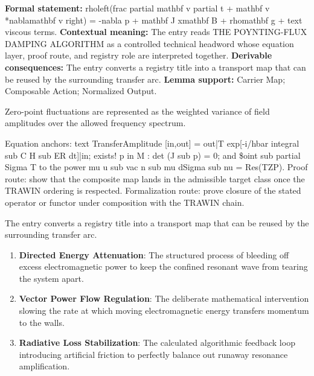\begingroup\footnotesize\setlength{\emergencystretch}{3em}\sloppy
\textbf{Formal statement:} rholeft(frac partial mathbf v partial t + mathbf v *nablamathbf v right) = -nabla p + mathbf J xmathbf B + rhomathbf g + text viscous terms. \textbf{Contextual meaning:} The entry reads THE POYNTING-FLUX DAMPING ALGORITHM as a controlled technical headword whose equation layer, proof route, and registry role are interpreted together. \textbf{Derivable consequences:} The entry converts a registry title into a transport map that can be reused by the surrounding transfer arc. \textbf{Lemma support:} Carrier Map; Composable Action; Normalized Output.\par
\endgroup

Zero-point fluctuations are represented as the weighted variance of field amplitudes over the allowed frequency spectrum.

Equation anchors: text TransferAmplitude [in,out] = out|T exp[-i/hbar integral sub C H sub ER dt]|in; exists! p in M : det (J sub p) = 0; and \$oint sub partial Sigma T to the power mu u sub vac n sub mu dSigma sub nu = Res(TZP). Proof route: show that the composite map lands in the admissible target class once the TRAWIN ordering is respected. Formalization route: prove closure of the stated operator or functor under composition with the TRAWIN chain.

The entry converts a registry title into a transport map that can be reused by the surrounding transfer arc.
\endgroup

\begin{enumerate}[leftmargin=1.6em,itemsep=6pt,topsep=4pt]
\item \textbf{Directed Energy Attenuation}: The structured process of bleeding off excess electromagnetic power to keep the confined resonant wave from tearing the system apart.
\item \textbf{Vector Power Flow Regulation}: The deliberate mathematical intervention slowing the rate at which moving electromagnetic energy transfers momentum to the walls.
\item \textbf{Radiative Loss Stabilization}: The calculated algorithmic feedback loop introducing artificial friction to perfectly balance out runaway resonance amplification.
\end{enumerate}


